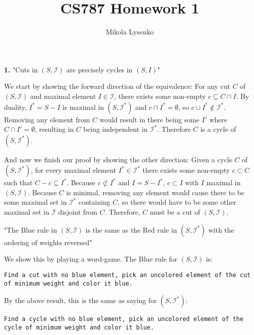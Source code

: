 \documentclass{article}
\title{CS787 Homework 1}
\author{Mikola Lysenko}
\begin{document}
\maketitle{}

\paragraph{} \textbf{1.}
"Cuts in $(S, \mathcal{I})$ are precisely cycles in $(S, I)$"
\vspace{0.08in}

We start by showing the forward direction of the equivalence:  For any cut $C$ of $(S, \mathcal{I})$ and maximal element $I \in \mathcal{I}$, there exists some non-empty $c \subseteq C \cap I$.  By duality, $I^* = S - I$ is maximal in $(S,\mathcal{I}^*)$ and $c \cap I^* = \emptyset$, so $c \cup I^* \notin \mathcal{I}^*$.  Removing any element from $C$ would result in there being some $I'$ where $C \cap I' = \emptyset$, resulting in $C$ being independent in $\mathcal{I}^*$.  Therefore $C$ is a cycle of $(S,\mathcal{I}^*)$.

And now we finish our proof by showing the other direction: Given a cycle $C$ of $(S, \mathcal{I}^*)$, for every maximal element $I^* \in \mathcal{I}^*$ there exists some non-empty $c \subset C$ such that $C - c \subseteq I^*$.  Because $c \not \subset I^*$ and $I = S - I^*$, $c \subset I$ with $I$ maximal in $(S, \mathcal{I})$.  Because $C$ is minimal, removing any element would cause there to be some maximal set in $\mathcal{I}^*$ containing $C$, so there would have to be some other maximal set in $\mathcal{I}$ disjoint from $C$.  Therefore, $C$ must be a cut of $(S, \mathcal{I})$.

\vspace{0.15in}
\noindent "The Blue rule in $(S, \mathcal{I})$ is the same as the Red rule in $(S, \mathcal{I}^*)$ with the ordering of weights reversed"
\vspace{0.08in}

We show this by playing a word-game.  The Blue rule for $(S, \mathcal{I})$ is:

\vspace{0.05in} \noindent \texttt{\small Find a cut with no blue element, pick an uncolored element of the cut of minimum weight and color it blue. }

\vspace{0.05in} By the above result, this is the same as saying for $(S, \mathcal{I^*})$:

\vspace{0.05in} \noindent \texttt{\small Find a cycle with no blue element, pick an uncolored element of the cycle of minimum weight and color it blue. }
\end{document}
